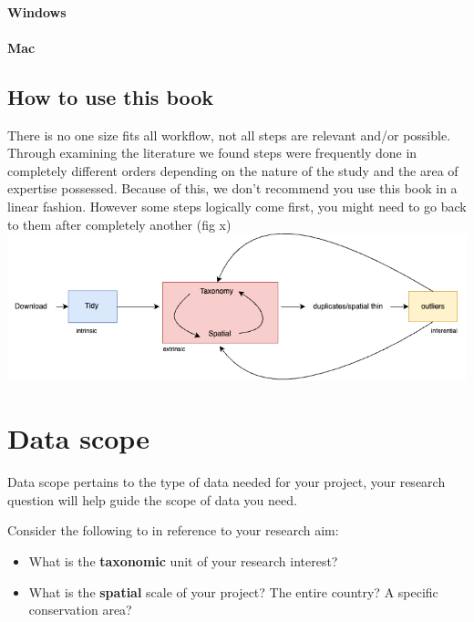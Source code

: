 \documentclass[
  letterpaper,
  DIV=11,
  numbers=noendperiod,
  oneside]{scrreprt}
\providecommand{\tightlist}{%
  \setlength{\itemsep}{0pt}\setlength{\parskip}{0pt}}\usepackage{longtable,booktabs,array}
\begin{document}
\hypertarget{windows-1}{%
\subsubsection*{Windows}\label{windows-1}}

\hypertarget{mac-1}{%
\subsubsection*{Mac}\label{mac-1}}

\hypertarget{how-to-use-this-book}{%
\section{How to use this book}\label{how-to-use-this-book}}

There is no one size fits all workflow, not all steps are relevant
and/or possible. Through examining the literature we found steps were
frequently done in completely different orders depending on the nature
of the study and the area of expertise possessed. Because of this, we
don't recommend you use this book in a linear fashion. However some
steps logically come first, you might need to go back to them after
completely another (fig x)
\includegraphics{images/data.cleaning-Page-2.drawio.png}


\hypertarget{data-scope}{%
\chapter{Data scope}\label{data-scope}}

Data scope pertains to the type of data needed for your project, your
research question will help guide the scope of data you need.

Consider the following to in reference to your research aim:

\begin{itemize}
\tightlist
\item
  What is the \textbf{taxonomic} unit of your research interest?
\item
  What is the \textbf{spatial} scale of your project? The entire
  country? A specific conservation area?
\end{itemize}
\end{document}
